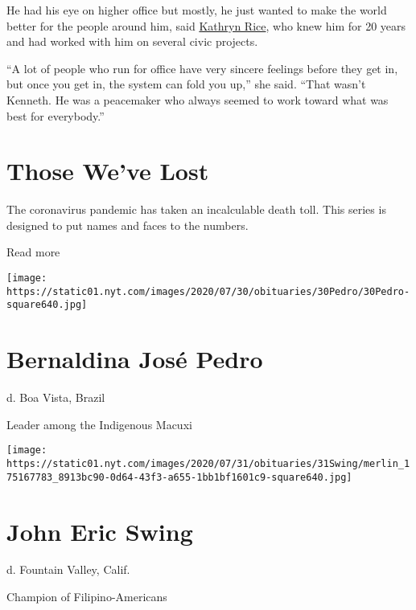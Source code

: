 He had his eye on higher office but mostly, he just wanted to make the
world better for the people around him, said
\href{https://www.facebook.com/TheRiceReport/?ref=nf\&hc_ref=ARTAfj43umcC9a0YgYNFwAP0Vu6zu40LE-Cck2XEECe7ULkeo6efNe-3v7g758qJt-k}{Kathryn
Rice}, who knew him for 20 years and had worked with him on several
civic projects.

``A lot of people who run for office have very sincere feelings before
they get in, but once you get in, the system can fold you up,'' she
said. ``That wasn't Kenneth. He was a peacemaker who always seemed to
work toward what was best for everybody.''

\href{https://www.nytimes.com/interactive/2020/obituaries/people-died-coronavirus-obituaries.html?action=click\&pgtype=Article\&state=default\&region=BELOW_MAIN_CONTENT\&context=covid_obits_promo}{}

\hypertarget{those-weve-lost}{%
\section{Those We've Lost}\label{those-weve-lost}}

The coronavirus pandemic has taken an incalculable death toll. This
series is designed to put names and faces to the numbers.

Read more

\texttt{[image: https://static01.nyt.com/images/2020/07/30/obituaries/30Pedro/30Pedro-square640.jpg]}

\hypertarget{bernaldina-josuxe9-pedro}{%
\section{Bernaldina José Pedro}\label{bernaldina-josuxe9-pedro}}

d. Boa Vista, Brazil

Leader among the Indigenous Macuxi

\texttt{[image: https://static01.nyt.com/images/2020/07/31/obituaries/31Swing/merlin\_175167783\_8913bc90-0d64-43f3-a655-1bb1bf1601c9-square640.jpg]}

\hypertarget{john-eric-swing}{%
\section{John Eric Swing}\label{john-eric-swing}}

d. Fountain Valley, Calif.

Champion of Filipino-Americans

